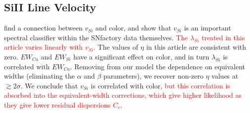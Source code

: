 \documentclass{aastex61}   	%
\begin{document}
\color{black}

%

\subsection{SiII Line Velocity}

\citet{2009ApJ...699L.139W, 2011ApJ...729...55F} find a connection between $v_{Si}$ and color, and  
\citet{2015MNRAS.447.1247S} show that $v_{Si}$ is an important spectral classifier within the SNfactory data themselves.
\textcolor{red}{The $\lambda_{Si}$ treated in this article varies linearly with $v_{Si}$.}
The values of $\eta$ in this article are consistent with zero.  $EW_{Ca}$ and $EW_{Si}$ have a significant effect on color,
and in turn $\lambda_{Si}$ is correlated with $EW_{Ca}$.
Removing from our model the dependence on equivalent widths (eliminating the  $\alpha$ and $\beta$ parameters), we recover
non-zero $\eta$ values at  $\gtrsim 2\sigma$.  We conclude that $v_{Si}$ is correlated with color, 
\textcolor{red}{but this correlation
is absorbed into the equivalent-width corrections, which give higher likelihood as they give lower residual dispersions $C_c$}.
\end{document}
